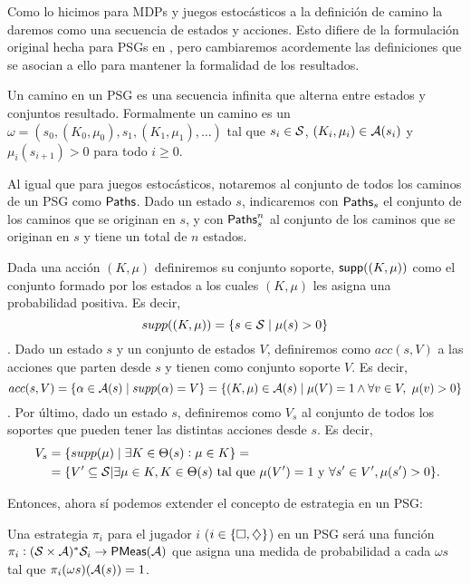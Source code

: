 Como lo hicimos para MDPs y juegos estocásticos a la definición de camino la
daremos como una secuencia de estados y acciones. Esto difiere de la
formulación original hecha para PSGs en \cite{Polytopal}, pero cambiaremos
acordemente las definiciones que se asocian a ello para mantener la formalidad
de los resultados.

\begin{definition}
	Un camino en un PSG es una secuencia infinita que alterna entre estados y conjuntos resultado. Formalmente un camino es un $\omega = (s_0, (K_0, \mu_0), s_1, (K_1, \mu_1), \dots)$ tal que $s_i \in \mathcal{S}$, $(K_i, \mu_i) \in \mathcal{A}(s_i)$ y $\mu_i(s_{i+1}) > 0$ para todo $i \geq 0$.

	Al igual que para juegos estocásticos, notaremos al conjunto de todos los
	caminos de un PSG como $\textsf{Paths}$. Dado un estado $s$, indicaremos con $\textsf{Paths}_s$
	el conjunto de los caminos que se originan en $s$, y con $\textsf{Paths}_s^n$ al
	conjunto de los caminos que se originan en $s$ y tiene un total de $n$ estados.
\end{definition}

\begin{definition}
	Dada una acción $(K, \mu)$ definiremos su conjunto soporte, $\textsf{supp}((K, \mu))$ como el conjunto formado por los estados a los cuales $(K, \mu)$ les asigna una probabilidad positiva. Es decir,
	$$supp((K, \mu)) = \{s \in \mathcal{S} \mid \mu(s) > 0\}$$.
	Dado un estado $s$ y un conjunto de estados $V$, definiremos como $acc(s, V)$ a
	las acciones que parten desde $s$ y tienen como conjunto soporte $V$. Es decir,
	$$acc(s, V) = \{\alpha \in \mathcal{A}(s) \mid supp(\alpha) = V\} = \{(K, \mu) \in \mathcal{A}(s) \mid \mu(V) = 1 \wedge \forall v \in V, \ \mu(v) > 0\}$$.
	Por último, dado un estado $s$, definiremos como $V_s$ al conjunto de todos los
	soportes que pueden tener las distintas acciones desde $s$. Es decir,
	\begin{align*}~\label{definicionVs}
		V_s &= \{supp(\mu) \mid \exists K \in \Theta(s): \mu \in K\} = \\
		&= \{V' \subseteq \mathcal{S} | \exists \mu \in K, K \in \Theta(s) \text{ tal que } \mu(V') = 1 \text{ y } \forall s' \in V', \mu(s') > 0\}.
	\end{align*}
\end{definition}

Entonces, ahora sí podemos extender el concepto de estrategia en un PSG:

\begin{definition}
	Una estrategia $\pi_i$ para el jugador $i$ ($i \in \{\square, \diamondsuit\}$) en un PSG será una función $\pi_i : (\mathcal{S} \times \mathcal{A})^* \mathcal{S}_i \rightarrow \textsf{PMeas}(\mathcal{A})$ que asigna una medida de probabilidad a cada $\omega s$ tal que $\pi_i(\omega s)(\mathcal{A}(s)) = 1$.
\end{definition}

